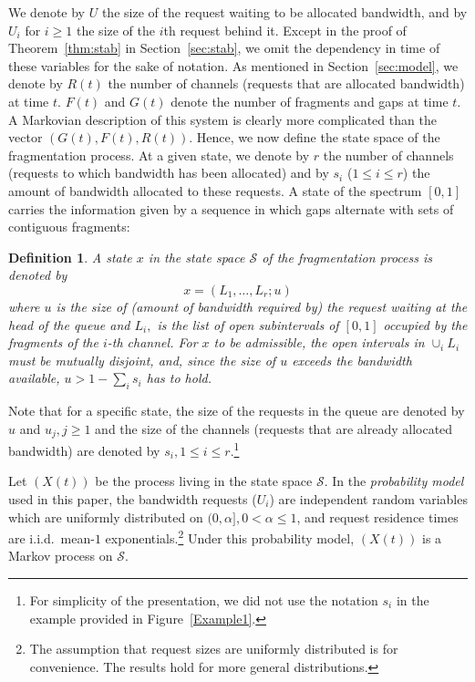 \documentclass{amsart}
\def\cal{\mathcal}
\newtheorem{defi}{Definition}
\begin{document}
We denote by $U$ the size of the request waiting to be allocated bandwidth, and by $U_i$ for $i \geq 1$ the size of the $i$th request behind it. Except in the proof of Theorem~\ref{thm:stab} in Section~\ref{sec:stab}, we omit the dependency in time of these variables for the sake of notation.
As mentioned in Section~\ref{sec:model}, we denote by $R(t)$ the number of channels (requests that are allocated bandwidth) at time $t$. $F(t)$ and $G(t)$ denote the number of fragments and gaps at time $t$.  A
Markovian description of  this system is clearly more complicated  than the vector $(G(t),
F(t),  R(t))$.  Hence, we now define the state space of the fragmentation process. At a given state, we denote by $r$ the number of channels (requests to which bandwidth has been allocated) and by $s_i$ ($1 \leq i \leq r$) the amount of bandwidth allocated to these requests. A state of the spectrum $[0,1]$ carries  the information given by a sequence in which gaps
alternate with  sets of  contiguous fragments:
\begin{defi}
A state $x$ in the state space ${\cal S}$ of the fragmentation process is denoted by
\begin{equation*}
\label{eq-state}
 x = (L_1, \ldots ,L_r; u)
\end{equation*}
where $u$ is the size  of (amount of bandwidth required by) the request waiting at the head of the queue and $L_i,$ is the list of open subintervals of $[0,1]$
occupied by  the fragments of the  $i$-th channel.  For $x$ to  be admissible, the
open intervals  in $\cup_i  L_i$ must  be mutually disjoint,  and, since  the size  of $u$
exceeds the bandwidth available, $u > 1-\sum_i s_i$ has to hold. \end{defi}
Note that for a specific state, the size of the requests in the queue are denoted by $u$ and $u_j, j\geq 1$ and the size of the channels (requests that are already allocated bandwidth) are denoted by $s_i, 1 \leq i \leq r$.\footnote{For simplicity of the presentation, we did not use the notation $s_i$ in the example provided in Figure~\ref{Example1}.}

Let $(X(t))$ be the process living in the state space $\mathcal{S}$. In the \emph{probability model} used in this paper, the bandwidth requests ($U_i$) are  independent random variables which are uniformly distributed  on $(0,\alpha], 0 < \alpha \leq 1$, and request residence times are i.i.d.\ mean-$1$ exponentials.\footnote{The assumption that request sizes are uniformly distributed is for convenience. The results hold for more general distributions.} Under this probability model, $(X(t))$ is a Markov process on $\mathcal{S}$.
\end{document}
